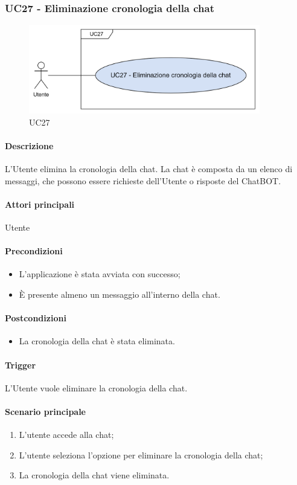 \subsubsection{UC27 - Eliminazione cronologia della chat}\label{UC27}

\begin{figure}[H]
  \centering
  \includegraphics[width=0.90\textwidth]{assets/uc27.png}
  \caption{UC27}
\end{figure}

\paragraph*{Descrizione}
L'Utente elimina la cronologia della chat. La chat è composta da un elenco di messaggi, che possono essere richieste dell'Utente o risposte del ChatBOT.

\paragraph*{Attori principali}
Utente

\paragraph*{Precondizioni}
\begin{itemize}
  \item L'applicazione è stata avviata con successo;
  \item È presente almeno un messaggio all'interno della chat.
\end{itemize}

\paragraph*{Postcondizioni}
\begin{itemize}
  \item La cronologia della chat è stata eliminata.
\end{itemize}

\paragraph*{Trigger}
L'Utente vuole eliminare la cronologia della chat.

\paragraph*{Scenario principale}
\begin{enumerate}
  \item L'utente accede alla chat;
  \item L'utente seleziona l'opzione per eliminare la cronologia della chat;
  \item La cronologia della chat viene eliminata.
\end{enumerate}

